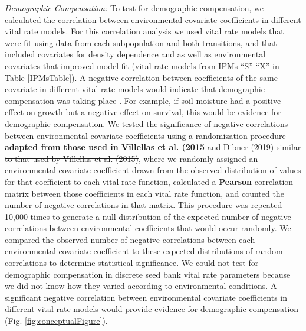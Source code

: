 \documentclass[12pt, letterpaper]{article}
\begin{document}
\textit{Demographic Compensation:} To test for demographic compensation, we calculated the correlation between environmental covariate coefficients in different vital rate models. For this correlation analysis we used vital rate models that were fit using data from each subpopulation and both transitions, and that included covariates for density dependence and as well as environmental covariates that improved model fit (vital rate models from IPMs “S”-“X” in Table \ref{IPMsTable}). A negative correlation between coefficients of the same covariate in different vital rate models would indicate that demographic compensation was taking place \cite{Villellas2015DemographicImplications, Dibner2019}. For example, if soil moisture had a positive effect on growth but a negative effect on survival, this would be evidence for demographic compensation. We tested the significance of negative correlations between environmental covariate coefficients using a randomization procedure \textbf{adapted from those used in Villellas et al. (2015} and Dibner (2019) \sout{similar to that used by Villellas et al. (2015)}, where we randomly assigned an environmental covariate coefficient drawn from the observed distribution of values for that coefficient to each vital rate function, calculated a \textbf{Pearson} correlation matrix between those coefficients in each vital rate function, and counted the number of negative correlations in that matrix. This procedure was repeated 10,000 times to generate a null distribution of the expected number of negative correlations between environmental coefficients that would occur randomly. We compared the observed number of negative correlations between each environmental covariate coefficient to these expected distributions of random correlations to determine statistical significance. We could not test for demographic compensation in discrete seed bank vital rate parameters because we did not know how they varied according to environmental conditions.  A significant negative correlation between environmental covariate coefficients in different vital rate models would provide evidence for demographic compensation (Fig. \ref{fig:conceptualFigure}).  
\end{document}
